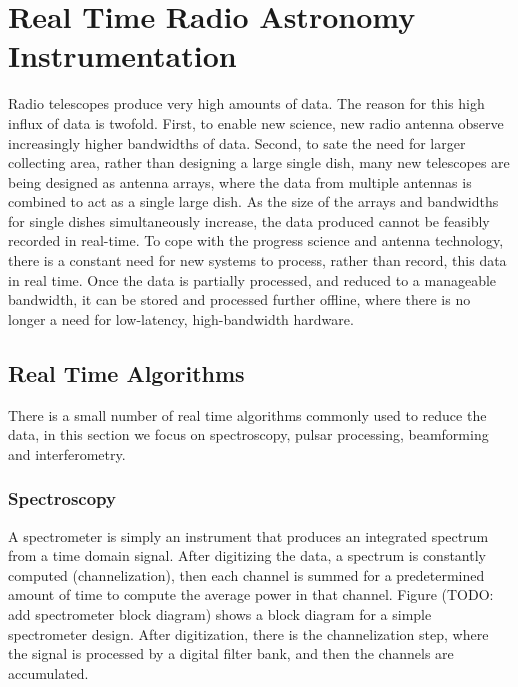\chapter{Real Time Radio Astronomy Instrumentation}

Radio telescopes produce very high amounts of data. 
The reason for this high influx of data is twofold. 
First, to enable new science, new radio antenna observe increasingly higher bandwidths of data. 
Second, to sate the need for larger collecting area, rather than designing a large single dish, many new telescopes are being designed as antenna arrays, where the data from multiple antennas is combined to act as a single large dish.
As the size of the arrays and bandwidths for single dishes simultaneously increase, the data produced cannot be feasibly recorded in real-time. 
To cope with the progress science and antenna technology, there is a constant need for new systems to process, rather than record, this data in real time.
Once the data is partially processed, and reduced to a manageable bandwidth, it can be stored and processed further offline, where there is no longer a need for low-latency, high-bandwidth hardware.


\section{Real Time Algorithms}
There is a small number of real time algorithms commonly used to reduce the data, in this section we focus on spectroscopy, pulsar processing, beamforming and interferometry. 


\subsection{Spectroscopy}
A spectrometer is simply an instrument that produces an integrated spectrum from a time domain signal. 
After digitizing the data, a spectrum is constantly computed (channelization), then each channel is summed for a predetermined amount of time to compute the average power in that channel. 
Figure (TODO: add spectrometer block diagram) shows a block diagram for a simple spectrometer design. 
After digitization, there is the channelization step, where the signal is processed by a digital filter bank, and then the channels are accumulated. 

